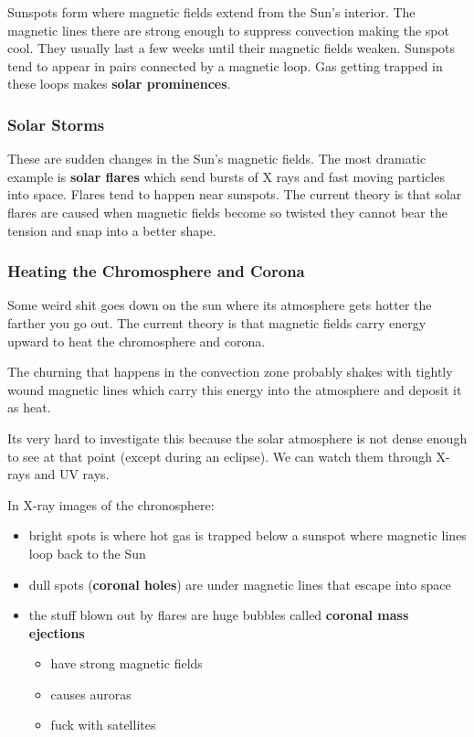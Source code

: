 \documentclass[12pt]{article}
\begin{document}
Sunspots form where magnetic fields extend from the Sun's interior. The magnetic lines there are strong enough to suppress convection making the spot cool. They usually last a few weeks until their magnetic fields weaken. Sunspots tend to appear in pairs connected by a magnetic loop. Gas getting trapped in these loops makes \textbf{solar prominences}.

\subsubsection{Solar Storms}
These are sudden changes in the Sun's magnetic fields. The most dramatic example is \textbf{solar flares} which send bursts of X rays and fast moving particles into space. Flares tend to happen near sunspots. The current theory is that solar flares are caused when magnetic fields become so twisted they cannot bear the tension and snap into a better shape.

\subsubsection{Heating the Chromosphere and Corona}
Some weird shit goes down on the sun where its atmosphere gets hotter the farther you go out. The current theory is that magnetic fields carry energy upward to heat the chromosphere and corona.

The churning that happens in the convection zone probably shakes with tightly wound magnetic lines which carry this energy into the atmosphere and deposit it as heat.

Its very hard to investigate this because the solar atmosphere is not dense enough to see at that point (except during an eclipse). We can watch them through X-rays and UV rays.

In X-ray images of the chronosphere:
\begin{itemize}
\item bright spots is where hot gas is trapped below a sunspot where magnetic lines loop back to the Sun
\item dull spots (\textbf{coronal holes}) are under magnetic lines that escape into space
\item the stuff blown out by flares are huge bubbles called \textbf{coronal mass ejections}
\begin{itemize}
\item have strong magnetic fields
\item causes auroras
\item fuck with satellites
\end{itemize}
\end{itemize}
\end{document}
